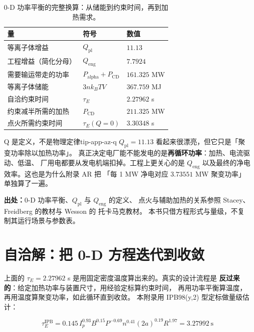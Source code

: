 \begin{table}[htbp]
\centering
\small
\setlength{\tabcolsep}{4pt}
\caption{0-D 功率平衡的完整换算：从储能到约束时间，再到加热需求。}
\label{tab:app-az-power}
\begin{tabular}{p{4.6cm}p{2.8cm}p{3.6cm}}
\toprule
量 & 符号 & 数值 \\
\midrule
等离子体增益 & $Q_\mathrm{pl}$ & $11.13$ \\
工程增益（简化分母） & $Q_\mathrm{eng}$ & $7.7924$ \\
需要输运带走的功率 & $P_\mathrm{alpha}+P_\mathrm{CD}$ & $161.325$ MW \\
等离子体储能 & $3nk_BTV$ & $367.759$ MJ \\
自洽约束时间 & $\tau_E$ & $2.27962$ s \\
约束减半所需的加热 & $P_\mathrm{CD}$ & $211.325$ MW \\
点火所需约束时间 & $\tau_E(Q=0)$ & $3.30348$ s \\
\bottomrule
\end{tabular}

\end{table}

\begin{tip}{Q 是定义，不是物理定律}{tip-app-az-q}
$Q_\mathrm{pl}=11.13$ 看起来很漂亮，但它只是「聚变功率除以加热功率」。
真正决定电厂能不能发电的是\textbf{再循环功率}：加热、电流驱动、低温、
厂用电都要从发电机端扣掉。工程上更关心的是
$Q_\mathrm{eng}$ 以及最终的净电效率。这也是为什么附录 AR 把
「每 1 MW 净电对应 $3.73551$ MW 聚变功率」单独算了一遍。
\end{tip}

{\footnotesize
\textbf{出处：}0-D 功率平衡、$Q_\mathrm{pl}$ 与 $Q_\mathrm{eng}$ 的定义、
点火与辅助加热的关系参照 Stacey、Freidberg 的教材与 Wesson 的
托卡马克教材。
本书只借方程形式与量级，不复制其运行场景与参数表。
}

\section{自洽解：把 0-D 方程迭代到收敛}
\label{sec:app-az-solve}

上面的 $\tau_E=2.27962$ s 是用固定密度温度算出来的。真实的设计流程是
\textbf{反过来的}：给定加热功率与装置尺寸，用经验定标算约束时间，
再用功率平衡算温度，再用温度算聚变功率，如此循环直到收敛。
本附录用 IPB98(y,2) 型定标做量级估计：

\begin{equation}
\tau_E^\mathrm{IPB}=0.145\,I_p^{0.93}B^{0.15}P^{-0.69}n^{0.41}
(2a)^{0.19}R^{1.97}=3.27992\ \mathrm{s}
\label{eq:app-az-ipb}
\end{equation}

